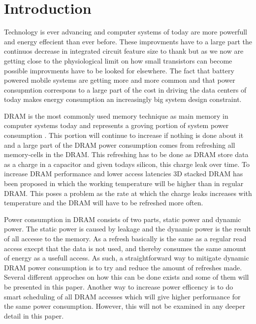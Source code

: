 \section{Introduction}
\label{sec:int}
Technology is ever advancing and computer systems of today are more powerfull and energy effecient than ever before. These improvments have to a large part the continuos decrease in integrated circuit feature size to thank but as we now are getting close to the physiological limit on how small transistors can become possible improvments have to be looked for elsewhere. The fact that battery powered mobile systems are getting more and more common and that power consupmtion correspons to a large part of the cost in driving the data centers of today makes energy consumption an increasingly big system design constraint.

DRAM is the most commonly used memory technique as main memory in computer systems today and represents a groving portion of system power consumption \cite{exascale}. This portion will continue to increase if nothing is done about it and a large part of the DRAM power consumption comes from refreshing all memory-cells in the DRAM. This refreshing has to be done as DRAM store data as a charge in a capacitor and given todays silicon, this charge leak over time. To increase DRAM performance and lower access latencies 3D stacked DRAM has been proposed in which the working temperature will be higher than in regular DRAM. This poses a problem as the rate at which the charge leaks increases with temperature and the DRAM will have to be refreshed more often.   

Power consumption in DRAM consists of two parts, static power and dynamic power. The static power is caused by leakage and the dynamic power is the result of all accesse to the memory. As a refresh basically is the same as a regular read access execpt that the data is not used, and thereby consumes the same amount of energy as a usefull access. As such, a straightforward way to mitigate dynamic DRAM power consumption is to try and reduce the amount of refreshes made. Several different approches on how this can be done exists and some of them will be presented in this paper. Another way to increase power efficency is to do smart scheduling of all DRAM accesses which will give higher performance for the same power consumption. However, this will not be examined in any deeper detail in this paper.  
